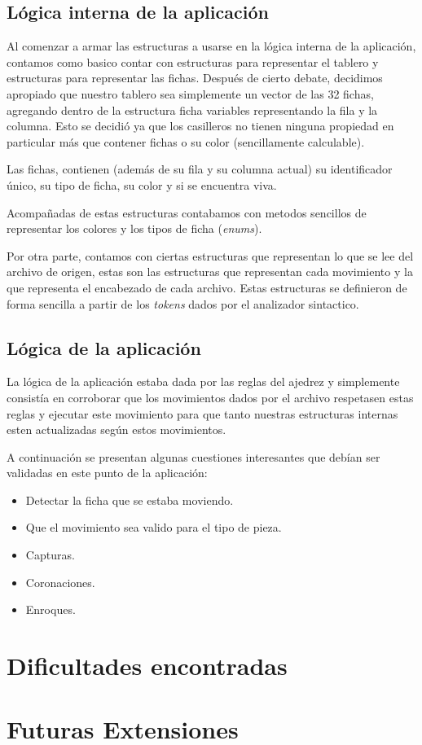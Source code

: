 \documentclass[a4paper,10pt]{article}
\begin{document}
\subsection{Lógica interna de la aplicación }

Al comenzar a armar las estructuras a usarse en la lógica interna de la aplicación, contamos como basico contar con estructuras
para representar el tablero y estructuras para representar las fichas. Después de cierto debate, decidimos apropiado que nuestro
tablero sea simplemente un vector de las 32 fichas, agregando dentro de la estructura ficha variables representando la fila y la 
columna. Esto se decidió ya que los casilleros no tienen ninguna propiedad en particular más que contener fichas o su color 
(sencillamente calculable).

Las fichas, contienen (además de su fila y su columna actual) su identificador único, su tipo de ficha, su color y si se encuentra 
viva.

Acompañadas de estas estructuras contabamos con metodos sencillos de representar los colores y los tipos de ficha (\textit{enums}).

Por otra parte, contamos con ciertas estructuras que representan lo que se lee del archivo de origen, estas son las estructuras que 
representan cada movimiento y la que representa el encabezado de cada archivo. Estas estructuras se definieron de forma sencilla a 
partir de los \textit{tokens} dados por el analizador sintactico.


\subsection{Lógica de la aplicación}

La lógica de la aplicación estaba dada por las reglas del ajedrez y simplemente consistía en corroborar que los movimientos dados
por el archivo respetasen estas reglas y ejecutar este movimiento para que tanto nuestras estructuras internas esten actualizadas 
según estos movimientos.

A continuación se presentan algunas cuestiones interesantes que debían ser validadas en este punto de la aplicación:
\begin{itemize}
 \item Detectar la ficha que se estaba moviendo.
 \item Que el movimiento sea valido para el tipo de pieza.
 \item Capturas.
 \item Coronaciones.
 \item Enroques.
\end{itemize}


\newpage

\section{Dificultades encontradas}
\newpage

\section{Futuras Extensiones}
   
\end{document}
